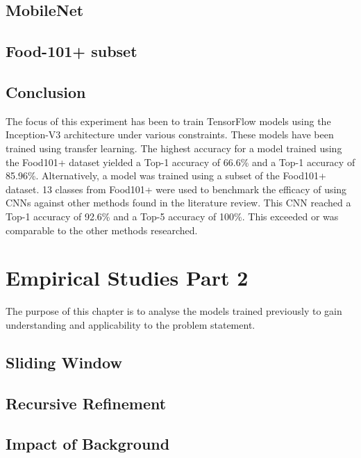 \section{MobileNet}
\label{mobilenet}


\section{Food-101+ subset}
\label{subset}


\section{Conclusion}
The focus of this experiment has been to train TensorFlow models using the Inception-V3 architecture under various constraints.
These models have been trained using transfer learning.
The highest accuracy for a model trained using the Food101+ dataset yielded a Top-1 accuracy of 66.6\% and a Top-1 accuracy of 85.96\%.
Alternatively, a model was trained using a subset of the Food101+ dataset.
13 classes from Food101+ were used to benchmark the efficacy of using CNNs against other methods found in the literature review.
This CNN reached a Top-1 accuracy of 92.6\% and a Top-5 accuracy of 100\%.
This exceeded or was comparable to the other methods researched.

\chapter{Empirical Studies Part 2}
The purpose of this chapter is to analyse the models trained previously to gain understanding and applicability to the problem statement.

\section{Sliding Window}
\label{slidingWindow}


\section{Recursive Refinement}
\label{RR}


\section{Impact of Background}
\label{background}


